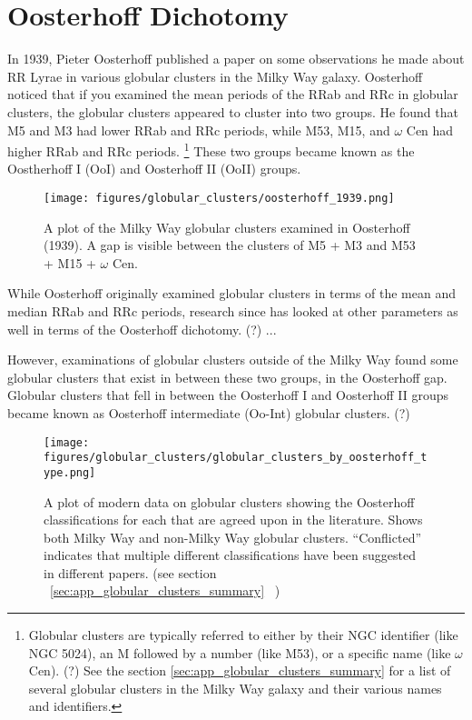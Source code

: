 \documentclass[]{article}
\begin{document}
\newpage

\section{Oosterhoff Dichotomy}

In 1939, Pieter Oosterhoff published a paper on some observations he made about RR Lyrae in various globular clusters in the Milky Way galaxy. Oosterhoff noticed that if you examined the mean periods of the RRab and RRc in globular clusters, the globular clusters appeared to cluster into two groups. He found that M5 and M3 had lower RRab and RRc periods, while M53, M15, and $\omega$ Cen had higher RRab and RRc periods. \footnote{Globular clusters are typically referred to either by their NGC identifier (like NGC 5024), an M followed by a number (like M53), or a specific name (like $\omega$ Cen). (?) See the section \ref{sec:app_globular_clusters_summary}  for a list of several globular clusters in the Milky Way galaxy and their various names and identifiers.} \cite{oosterhoff_1939} These two groups became known as the Oostherhoff I (OoI) and Oosterhoff II (OoII) groups. \cite{cacciari_2005}

\begin{figure}
	\centering
	\texttt{[image: figures/globular\_clusters/oosterhoff\_1939.png]}
	\caption{A plot of the Milky Way globular clusters examined in Oosterhoff (1939). \cite{oosterhoff_1939} A gap is visible between the clusters of M5 + M3 and M53 + M15 + $\omega$ Cen.}
	\label{fig:oosterhoff_1939_globular_clusters}
\end{figure}

While Oosterhoff originally examined globular clusters in terms of the mean and median RRab and RRc periods, research since has looked at other parameters as well in terms of the Oosterhoff dichotomy. (?) ...

However, examinations of globular clusters outside of the Milky Way found some globular clusters that exist in between these two groups, in the Oosterhoff gap. \cite{szczygiel_2009, joo_2018} Globular clusters that fell in between the Oosterhoff I and Oosterhoff II groups became known as Oosterhoff intermediate (Oo-Int) globular clusters. (?)

\begin{figure}
	\centering
	\texttt{[image: figures/globular\_clusters/globular\_clusters\_by\_oosterhoff\_type.png]}
	\caption{A plot of modern data on globular clusters showing the Oosterhoff classifications for each that are agreed upon in the literature. Shows both Milky Way and non-Milky Way globular clusters. ``Conflicted'' indicates that multiple different classifications have been suggested in different papers. (see section ~\ref{sec:app_globular_clusters_summary}~ )}
	\label{fig:modern_globular_clusters}
\end{figure}
\end{document}

